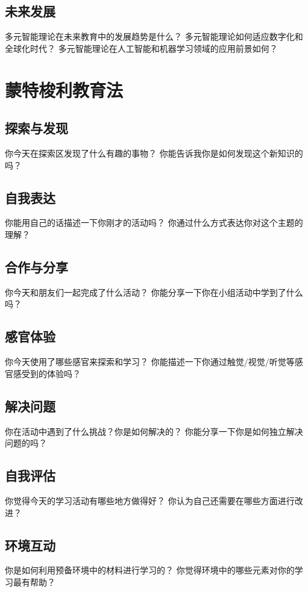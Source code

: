 \documentclass[12pt]{book}
\begin{document}
\subsection{未来发展}
多元智能理论在未来教育中的发展趋势是什么？
多元智能理论如何适应数字化和全球化时代？
多元智能理论在人工智能和机器学习领域的应用前景如何？



\section{蒙特梭利教育法}
\subsection{探索与发现}
你今天在探索区发现了什么有趣的事物？
你能告诉我你是如何发现这个新知识的吗？

\subsection{自我表达}
你能用自己的话描述一下你刚才的活动吗？
你通过什么方式表达你对这个主题的理解？

\subsection{合作与分享}
你今天和朋友们一起完成了什么活动？
你能分享一下你在小组活动中学到了什么吗？

\subsection{感官体验}
你今天使用了哪些感官来探索和学习？
你能描述一下你通过触觉/视觉/听觉等感官感受到的体验吗？

\subsection{解决问题}
你在活动中遇到了什么挑战？你是如何解决的？
你能分享一下你是如何独立解决问题的吗？

\subsection{自我评估}
你觉得今天的学习活动有哪些地方做得好？
你认为自己还需要在哪些方面进行改进？

\subsection{环境互动}
你是如何利用预备环境中的材料进行学习的？
你觉得环境中的哪些元素对你的学习最有帮助？
\end{document}
